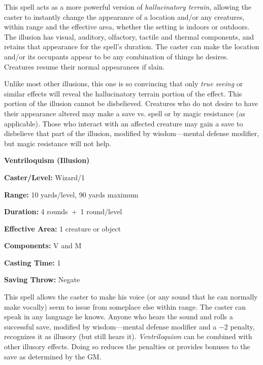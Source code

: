 \begin{multicols}{2}
This spell acts as a more powerful version of \textit{hallucinatory terrain}, allowing the caster to instantly change the appearance of a location and/or any creatures, within range and the effective area, whether the setting is indoors or outdoors.  The illusion has visual, auditory, olfactory, tactile and thermal components, and retains that appearance for the spell's duration.  The caster can make the location and/or its occupants appear to be any combination of things he desires.  Creatures resume their normal appearances if slain.  

Unlike most other illusions, this one is so convincing that only \textit{true seeing} or similar effects will reveal the hallucinatory terrain portion of the effect.  This portion of the illusion cannot be disbelieved.  Creatures who do not desire to have their appearance altered may make a save vs. spell or by magic resistance (as applicable).  Those who interact with an affected creature may gain a save to disbelieve that part of the illusion, modified by wisdom---mental defense modifier, but magic resistance will not help.  

\vspace{1em}

\noindent
\begin{minipage}{\columnwidth}

\noindent \textbf{Ventriloquism (Illusion)}

\noindent \textbf{Caster/Level:} Wizard/1

\noindent \textbf{Range:} 10 yards/level, 90 yards maximum

\noindent \textbf{Duration:} 4 rounds~+~1 round/level

\noindent \textbf{Effective Area:} 1 creature or object

\noindent \textbf{Components:} V and M

\noindent \textbf{Casting Time:} 1

\noindent \textbf{Saving Throw:} Negate

\end{minipage}

This spell allows the caster to make his voice (or any sound that he can normally make vocally) seem to issue from someplace else within range.  The caster can speak in any language he knows.  Anyone who hears the sound and rolls a successful save, modified by wisdom---mental defense modifier and a $-2$ penalty, recognizes it as illusory (but still hears it).  \textit{Ventriloquism} can be combined with other illusory effects.  Doing so reduces the penalties or provides bonuses to the save as determined by the GM. 


\end{multicols}
